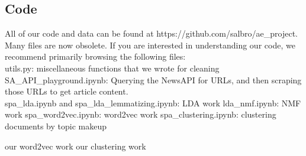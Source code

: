 \documentclass[11pt]{article}
\begin{document}
\subsection{Code}
All of our code and data can be found at https://github.com/salbro/ae_project.  Many files are now obsolete. If you are interested in understanding our code, we recommend primarily browsing the following files: \\
utils.py: miscellaneous functions that we wrote for cleaning
SA_API_playground.ipynb: Querying the NewsAPI for URLs, and then scraping those URLs to get article content. \\
spa_lda.ipynb and spa_lda_lemmatizing.ipynb: LDA work
lda_nmf.ipynb: NMF work
spa_word2vec.ipynb: word2vec work
spa_clustering.ipynb: clustering documents by topic makeup


our word2vec work
our clustering work

 
\end{document}
